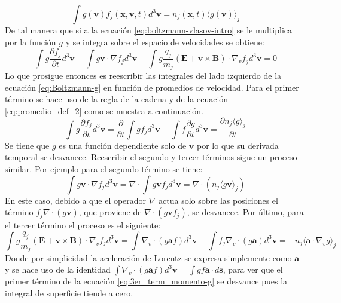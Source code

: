 \documentclass[../tesis_main_file.tex]{subfiles}
\begin{document}
\begin{equation}
\label{eq:promedio_def_2}
\int g(\textbf{v})f_j(\textbf{x},\textbf{v},t)d^3\textbf{v}= n_j(\textbf{x},t)\langle g(\textbf{v}) \rangle _j
\end{equation}
De tal manera que si a la ecuación \ref{eq:boltzmann-vlasov-intro} se le multiplica por la función $g$ y se integra sobre el espacio de velocidades se obtiene:
\begin{equation}
\label{eq:Boltzmann-g}
 \int g\frac{\partial f_j}{\partial t}d^3 \textbf{v}+ \int g\textbf{v}\cdot \nabla f_j d^3 \textbf{v} + \int g\frac{q_j}{m_j}\left( \textbf{E} + \textbf{v} \times \textbf{B}\right)\cdot \nabla _v f_j d^3 \textbf{v}=0
\end{equation}
Lo que prosigue entonces es reescribir las integrales del lado izquierdo de la ecuación \ref{eq:Boltzmann-g} en función de promedios de velocidad.
Para el primer término se hace uso de la regla de la cadena y de la ecuación \ref{eq:promedio_def_2} como se muestra a continuación.
\begin{equation}
\int g\frac{\partial f_j}{\partial t}d^3 \textbf{v}=\frac{\partial}{\partial t}\int gf_jd^3\textbf{v}-\int f\frac{\partial g}{\partial t}d^3\textbf{v}=\frac{\partial n_j \langle g\rangle_j}{\partial t}
\end{equation}
Se tiene que $g$ es una función dependiente solo de $\textbf{v}$ por lo que su derivada temporal se desvanece.
Reescribir el segundo  y tercer términos  sigue un proceso similar. Por ejemplo para el segundo término se tiene:
\begin{equation}
\int g\textbf{v}\cdot \nabla f_j d^3 \textbf{v}= \nabla \cdot \int g\textbf{v}f_j d^3\textbf{v}=\nabla \cdot \left(n_j \langle g\textbf{v} \rangle_j \right)
\end{equation}
En este caso, debido a que el operador $\nabla$ actua solo sobre las posiciones el término $f_j \nabla \cdot (g\textbf{v})$, que proviene de $\nabla \cdot (g\textbf{v}f_j)$, se desvanece.
Por último, para el tercer término el proceso es el siguiente:
\begin{equation}
\label{eq:3er_term_momento-g}
\int g\frac{q_j}{m_j}\left( \textbf{E} + \textbf{v} \times \textbf{B}\right)\cdot \nabla _v f_j d^3 \textbf{v}= \int \nabla_v\cdot (g\textbf{a}f)d^3\textbf{v}- \int f_j \nabla_v\cdot (g\textbf{a})d^3\textbf{v}=-n_j\langle \textbf{a}\cdot \nabla_v g\rangle_j
\end{equation}
Donde por simplicidad la aceleración de Lorentz se expresa simplemente como $\textbf{a}$ y se hace uso de la identidad $\int \nabla_v\cdot (g\textbf{a}f)d^3\textbf{v}=\int gf\textbf{a}\cdot d\textbf{s}$, para ver que el primer término de la ecuación \ref{eq:3er_term_momento-g} se desvance pues la integral de superficie tiende a cero. 
\end{document}
